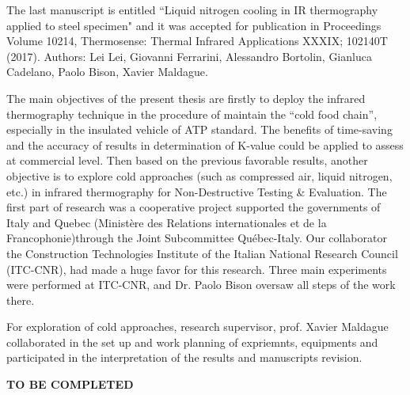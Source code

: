 The last manuscript is entitled ``Liquid nitrogen cooling in IR thermography applied to steel specimen" and it was accepted for publication in Proceedings Volume 10214, Thermosense: Thermal Infrared Applications XXXIX; 102140T (2017). Authors: Lei Lei, Giovanni Ferrarini, Alessandro Bortolin, Gianluca Cadelano, Paolo Bison, Xavier Maldague.

The main objectives of the present thesis are firstly to deploy the infrared thermography technique in the procedure of maintain the ``cold food chain'', especially in the insulated vehicle of ATP standard. The benefits of time-saving and the accuracy of results in determination of K-value could be applied to assess at commercial level. Then based on the previous favorable results, another objective is to explore cold approaches (such as compressed air, liquid nitrogen, etc.) in infrared thermography for Non-Destructive Testing \& Evaluation. The first part of research was a cooperative project supported the governments of Italy and Quebec (Ministère des Relations internationales et de la Francophonie)through the Joint Subcommittee Québec-Italy. Our collaborator the Construction Technologies Institute of the Italian National Research Council (ITC-CNR), had made a huge favor for this research. Three main experiments were performed at ITC-CNR, and Dr. Paolo Bison oversaw all steps of the work there.

For exploration of cold approaches, research supervisor, prof. Xavier Maldague collaborated in the set up and work planning of expriemnts, equipments and participated in the interpretation of the results and manuscripts revision.

\textbf{TO BE COMPLETED}


